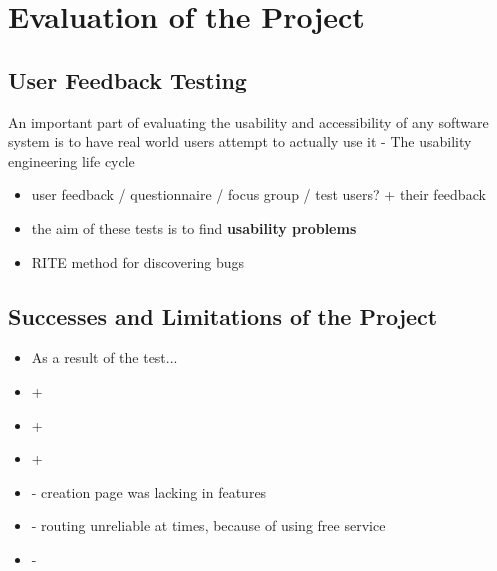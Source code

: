 \section{Evaluation of the Project}

\subsection{User Feedback Testing}
An important part of evaluating the usability and accessibility of any software system is
to have real world users attempt to actually use it - The usability engineering life cycle \cite{nielsen1992usability}
{\color{red}
	\begin{itemize}
		\item user feedback / questionnaire / focus group / test users? + their feedback
		\item the aim of these tests is to find \textbf{usability problems}
		\item RITE method for discovering bugs
	\end{itemize}
}

\subsection{Successes and Limitations of the Project}
{\color{red}
	\begin{itemize}
		\item As a result of the test...
		\item +
		\item +
		\item +
		\item - creation page was lacking in features
		\item - routing unreliable at times, because of using free service
		\item -
	\end{itemize}
}
